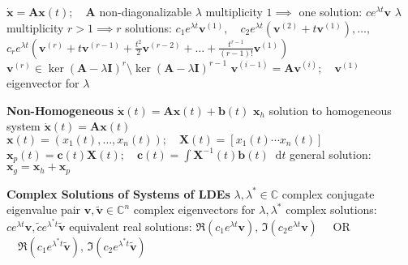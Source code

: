\documentclass[10pt, a4paper]{article}
\newcommand*\diff{\mathop{}\!\mathrm{d}} %
\begin{document}
\begin{multicols}{2}
$ \dot{\bm{x}} = \mathbf{A} \bm{x}(t); \quad \mathbf{A} $ non-diagonalizable \newline
$ \lambda  $ multiplicity $ 1 \implies $ one solution: $ c e^{\lambda t} \bm{v} $ \newline
$ \lambda  $ multiplicity $ r > 1 \implies r $ solutions: \vspace{1mm} \newline
$ c_1 e^{\lambda t} \bm{v}^{(1)}, \quad c_2 e^{\lambda t} \left (\bm{v}^{(2)} + t\bm{v}^{(1)} \right ), \dots, $ \newline
$ c_r e^{\lambda t} \left (\bm{v}^{(r)} + t \bm{v}^{(r-1)} + \frac{t^2}{2}\bm{v}^{(r-2)} + \dots + \frac{t^{r-1}}{(r-1)!} \bm{v}^{(1)} \right )  $\newline
$ \bm{v}^{(r)} \in \ker (\mathbf{A} - \lambda \mathbf{I})^r \setminus \ker (\mathbf{A} - \lambda \mathbf{I})^{r-1} $ \vspace{1mm} \newline
$ \bm{v}^{(i-1)} = \mathbf{A} \bm{v}^{(i)}; \quad \bm{v}^{(1)} $ eigenvector for $ \lambda $

\vspace{1mm}
\textbf{Non-Homogeneous} \newline
$ \dot{\bm{x}}(t) = \mathbf{A} \bm{x}(t) + \bm{b}(t) $ \newline
$ \bm{x}_h $ solution to homogeneous system $ \dot{\bm{x}}(t) = \mathbf{A} \bm{x}(t) $ \newline
$ \bm{x}(t) = (x_1(t), \dots, x_n(t)); \quad \mathbf{X}(t) = [x_1(t) \cdots x_n(t)] $ \vspace{1mm} \newline
$ \bm{x}_p(t) = \bm{c}(t) \mathbf{X}(t); \quad \bm{c}(t) = \int \mathbf{X}^{-1}(t) \bm{b}(t) \diff t $\newline
general solution: $ \bm{x}_g = \bm{x}_h + \bm{x}_p $

\vspace{1mm}
\textbf{Complex Solutions of Systems of LDEs}\newline
$ \lambda, \lambda^* \in \mathbb{C} $ complex conjugate eigenvalue pair \newline
$ \bm{v}, \tilde{\bm{v}} \in \mathbb{C}^n $ complex eigenvectors for $ \lambda, \lambda^* $ \newline
complex solutions: $ c e^{\lambda t} \bm{v}, \tilde{c} e^{\lambda^* t} \tilde{\bm{v}} $  \newline
equivalent real solutions: \newline
$ \Re(c_1 e^{\lambda t} \bm{v}), \, \Im(c_2 e^{\lambda t} \bm{v}) \quad $ OR $ \quad \Re(c_1 e^{\lambda^* t} \tilde{\bm{v}}), \, \Im(c_2 e^{\lambda^* t} \tilde{\bm{v}}) $


\end{multicols}
\end{document}
